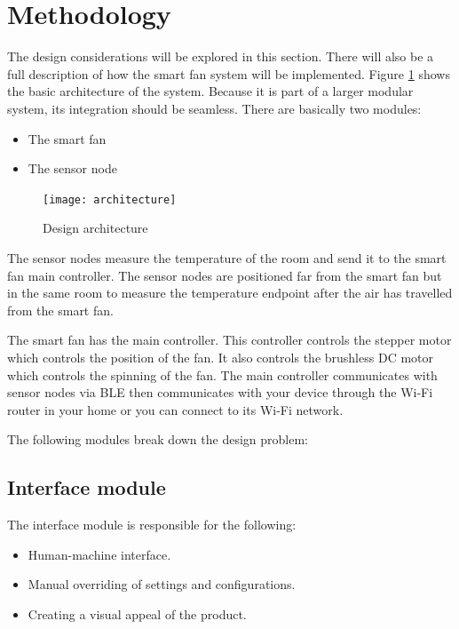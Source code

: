 \section{Methodology}
The design considerations will be explored in this section. There will also be a full description of how the smart fan system will be implemented. Figure \ref{fig:architecture} shows the basic architecture of the system. Because it is part of a larger modular system, its integration should be seamless. There are basically two modules:

\begin{itemize}
\item The smart fan
\item The sensor node
\end{itemize}

\begin{figure}[h]
\texttt{[image: architecture]}
\centering
\caption{Design architecture}
\label{fig:architecture}
\end{figure}

The sensor nodes measure the temperature of the room and send it to the smart fan main controller. The sensor nodes are positioned far from the smart fan but in the same room to measure the temperature endpoint after the air has travelled from the smart fan.
\par
The smart fan has the main controller. This controller controls the stepper motor which controls the position of the fan. It also controls the brushless \ac{DC} motor which controls the spinning of the fan. The main controller communicates with sensor nodes via \ac{BLE} then communicates with your device through the \ac{Wi-Fi} router in your home or you can connect to its \ac{Wi-Fi} network.
\par
The following modules break down the design problem:

\subsection{Interface module}

The interface module is responsible for the following:
\begin{itemize}
\item Human-machine interface.
\item Manual overriding of settings and configurations.
\item Creating a visual appeal of the product.
\end{itemize}

